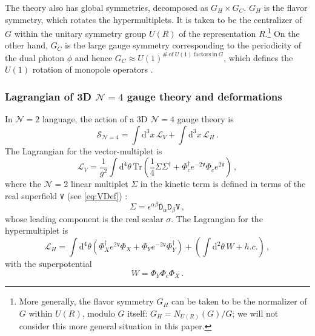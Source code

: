 \documentclass[12pt,a4paper]{article}
\renewcommand{\(}{\left(}
\renewcommand{\)}{\right)}
\renewcommand{\(}{\left(}
\renewcommand{\)}{\right)}
\begin{document}
The theory also has global symmetries, decomposed as $G_H\times G_C$. 
$G_H$ is the flavor symmetry, which rotates the hypermultiplets. 
It is taken to be the centralizer of $G$ within the unitary symmetry group $U(R)$ of the representation $R$.\footnote{More generally, the flavor symmetry $G_H$ can be taken to be the normalizer of $G$ within $U(R)$, modulo $G$ itself: $G_H=N_{U(R)}(G)/G$; we will not consider this more general situation in this paper.} 
On the other hand, $G_C$ is the large gauge symmetry corresponding to the periodicity of the dual photon $\phi$ and hence $G_C \approx U(1)^{\mathrm{\#\ of\ }U(1)\ \mathrm{factors\ in}\ G}$, which defines the $U(1)$ rotation of monopole operators \cite{Bullimore:2016hdc}.

	
\subsubsection{\texorpdfstring{Lagrangian of 3D $\mathcal{N}=4$ gauge theory and deformations}{Lagrangian of 3D N=4 gauge theory and deformations}}
\label{appssec:Lagrangian}

In $\mathcal{N}=2$ language, the action of a 3D $\mathcal{N}=4$ gauge theory is
\begin{equation}
\mathcal{S}_{\mathcal{N}=4}
=  \int \mathrm{d}^3x\, \mathcal{L}_V
+\int \mathrm{d}^3x\,\mathcal{L}_H\,.
\end{equation}
The Lagrangian for the vector-multiplet is 
\begin{equation}\label{eq:vec-L} 
\mathcal{L}_V=
\frac{1}{g^2}\int\mathrm{d}^4\theta \,
\mathrm{Tr}\left(\frac{1}{4}\mathtt{\Sigma}\mathtt{\Sigma^\dag}+ \mathtt{\Phi}_c^\dag e^{-2\mathtt{V}}\mathtt{\Phi}_c e^{2\mathtt{V}}\right)\,, 
\end{equation}
where the $\mathcal{N}=2$ linear multiplet $\mathtt{\Sigma}$ in the kinetic term is defined in terms of the real superfield $\mathtt{V}$ (see \eqref{eq:VDef}) \cite{Aharony_1997}:
\begin{equation}
\mathtt{\Sigma}=\epsilon^{\alpha\beta}\bar{\mathtt{D}}_\alpha \mathtt{D}_\beta \mathtt{V}\,,
\end{equation}
whose leading component is the real scalar $\sigma$. 
The Lagrangian for the hypermultiplet is
\begin{equation}\label{eq:hyper-L}
\mathcal{L}_H=\int\mathrm{d}^4\theta \left(\mathtt{\Phi}_X^\dag e^{2\mathtt{V}} \mathtt{\Phi}_X+ \mathtt{\Phi}_Y e^{-2\mathtt{V}} \mathtt{\Phi}_Y^\dag\right)
+ \left(\int\mathrm{d}^2 \theta \, W + h.c.\right)\,,
\end{equation} 
with the superpotential 
\begin{equation}\label{eq:WDef}
W=  \mathtt{\Phi}_Y\mathtt{\Phi}_c\mathtt{\Phi}_X\,.
\end{equation}
	
\end{document}
